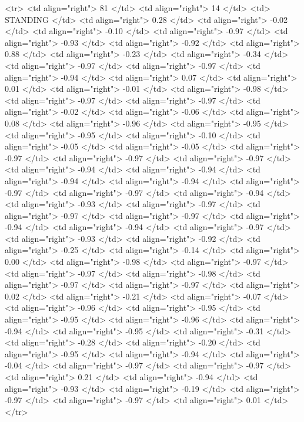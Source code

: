   <tr> <td align="right"> 81 </td> <td align="right">  14 </td> <td> STANDING </td> <td align="right"> 0.28 </td> <td align="right"> -0.02 </td> <td align="right"> -0.10 </td> <td align="right"> -0.97 </td> <td align="right"> -0.93 </td> <td align="right"> -0.92 </td> <td align="right"> 0.88 </td> <td align="right"> -0.23 </td> <td align="right"> -0.34 </td> <td align="right"> -0.97 </td> <td align="right"> -0.97 </td> <td align="right"> -0.94 </td> <td align="right"> 0.07 </td> <td align="right"> 0.01 </td> <td align="right"> -0.01 </td> <td align="right"> -0.98 </td> <td align="right"> -0.97 </td> <td align="right"> -0.97 </td> <td align="right"> -0.02 </td> <td align="right"> -0.06 </td> <td align="right"> 0.08 </td> <td align="right"> -0.96 </td> <td align="right"> -0.95 </td> <td align="right"> -0.95 </td> <td align="right"> -0.10 </td> <td align="right"> -0.05 </td> <td align="right"> -0.05 </td> <td align="right"> -0.97 </td> <td align="right"> -0.97 </td> <td align="right"> -0.97 </td> <td align="right"> -0.94 </td> <td align="right"> -0.94 </td> <td align="right"> -0.94 </td> <td align="right"> -0.94 </td> <td align="right"> -0.97 </td> <td align="right"> -0.97 </td> <td align="right"> -0.94 </td> <td align="right"> -0.93 </td> <td align="right"> -0.97 </td> <td align="right"> -0.97 </td> <td align="right"> -0.97 </td> <td align="right"> -0.94 </td> <td align="right"> -0.94 </td> <td align="right"> -0.97 </td> <td align="right"> -0.93 </td> <td align="right"> -0.92 </td> <td align="right"> -0.25 </td> <td align="right"> -0.14 </td> <td align="right"> 0.00 </td> <td align="right"> -0.98 </td> <td align="right"> -0.97 </td> <td align="right"> -0.97 </td> <td align="right"> -0.98 </td> <td align="right"> -0.97 </td> <td align="right"> -0.97 </td> <td align="right"> 0.02 </td> <td align="right"> -0.21 </td> <td align="right"> -0.07 </td> <td align="right"> -0.96 </td> <td align="right"> -0.95 </td> <td align="right"> -0.95 </td> <td align="right"> -0.96 </td> <td align="right"> -0.94 </td> <td align="right"> -0.95 </td> <td align="right"> -0.31 </td> <td align="right"> -0.28 </td> <td align="right"> -0.20 </td> <td align="right"> -0.95 </td> <td align="right"> -0.94 </td> <td align="right"> -0.04 </td> <td align="right"> -0.97 </td> <td align="right"> -0.97 </td> <td align="right"> 0.21 </td> <td align="right"> -0.94 </td> <td align="right"> -0.93 </td> <td align="right"> -0.19 </td> <td align="right"> -0.97 </td> <td align="right"> -0.97 </td> <td align="right"> 0.01 </td> </tr>
